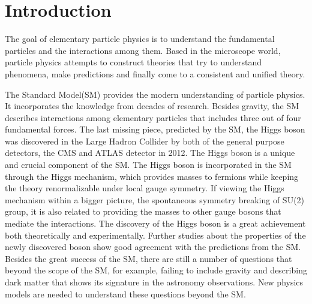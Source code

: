 
\chapter{Introduction}

The goal of elementary particle physics is to understand the fundamental particles and the interactions among them. Based in the microscope world, particle physics attempts to construct theories that try to understand phenomena, make predictions and finally come to a consistent and unified theory. 

The Standard Model(SM) provides the modern understanding of particle physics. It incorporates the knowledge from decades of research. Besides gravity, the SM describes interactions among elementary particles that includes three out of four fundamental forces. The last missing piece, predicted by the SM, the Higgs boson was discovered in the Large Hadron Collider by both of the general purpose detectors, the CMS and ATLAS detector in 2012. The Higgs boson is a unique and crucial component of the SM. The Higgs boson is incorporated in the SM through the Higgs mechanism, which provides masses to fermions while keeping the theory renormalizable under local gauge symmetry. If viewing the Higgs mechanism within a bigger picture, the spontaneous symmetry breaking of SU(2) group, it is also related to providing the masses to other gauge bosons that mediate the interactions. The discovery of the Higgs boson is a great achievement both theoretically and experimentally. Further studies about the properties of the newly discovered boson show good agreement with the predictions from the SM. Besides the great success of the SM, there are still a number of questions that beyond the scope of the SM, for example, failing to include gravity and describing dark matter that shows its signature in the astronomy observations. New physics models are needed to understand these questions beyond the SM.  


